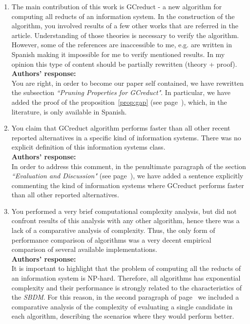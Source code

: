 \documentclass{letter}
\begin{document}
\begin{letter}{}
  \begin{enumerate}
	\item The main contribution of this work is GCreduct - a new algorithm for computing all reducts of an information system. In the construction of the algorithm, you involved results of a few other works that are referred in the article.  Understanding of those theories is necessary to verify the algorithm. However, some of the references are inaccessible  to me, e.g. are written in Spanish making it impossible for me to verify mentioned results. In my opinion this type of content should be partially rewritten (theory + proof).\\
	\textbf{Authors’ response:} \\
	You are right, in order to become our paper self contained, we have rewritten the subsection \textit{``Pruning Properties for GCreduct"}. In particular, we have added the proof of the proposition~\ref{prop:gap} (see page~\pageref{proof:gap}), which, in the literature, is only available in Spanish.
	
	\item You claim that GCreduct algorithm performs faster than all other recent reported alternatives in a specific kind of information systems. There was no explicit definition of this information systems class.\\
	\textbf{Authors’ response:}\\
	In order to address this comment, in the penultimate paragraph of the section \textit{``Evaluation and Discussion"}	(see page~\pageref{par:kind}), we have added a sentence explicitly commenting the kind of information systems where GCreduct  performs faster than all other reported alternatives.

	\item You performed a very brief computational complexity analysis, but did not confront results of this analysis with any other algorithm, hence there was a lack of a comparative analysis of complexity. Thus, the only form of performance comparison of algorithms was a very decent empirical comparison of several available implementations.\\
	\textbf{Authors’ response:} \\
	It is important to highlight that the problem of computing all the reducts of an information system is NP-hard. Therefore, all algorithms has exponential complexity and their performance is strongly related to the characteristics of the \textit{SBDM}. For this reason, in the second paragraph of page~\pageref{par:complexity} we included a comparative analysis of the complexity of evaluating a single candidate in each algorithm, describing the scenarios where they would perform better.
	

\end{enumerate}
\end{letter}
\end{document}
